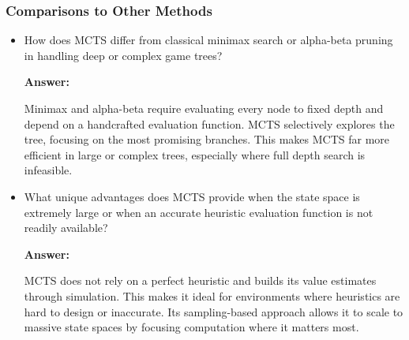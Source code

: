 \subsubsection{Comparisons to Other Methods}
\begin{itemize}
    \item How does MCTS differ from classical minimax search or alpha-beta pruning in handling deep or complex game trees?  

    \textbf{Answer:}

    Minimax and alpha-beta require evaluating every node to fixed depth and depend on a handcrafted evaluation function. MCTS selectively explores the tree, focusing on the most promising branches. This makes MCTS far more efficient in large or complex trees, especially where full depth search is infeasible.

    \item What unique advantages does MCTS provide when the state space is extremely large or when an accurate heuristic evaluation function is not readily available?

    \textbf{Answer:}

    MCTS does not rely on a perfect heuristic and builds its value estimates through simulation. This makes it ideal for environments where heuristics are hard to design or inaccurate. Its sampling-based approach allows it to scale to massive state spaces by focusing computation where it matters most.

\end{itemize}